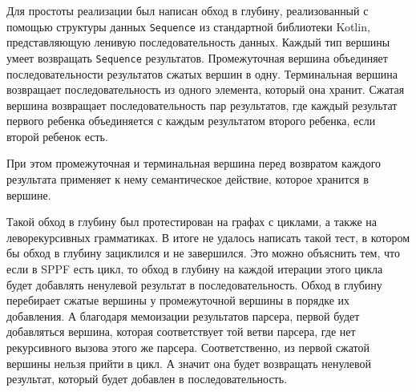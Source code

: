Для простоты реализации был написан обход в глубину, реализованный с помощью структуры данных \texttt{Sequence} из стандартной библиотеки Kotlin, представляющую ленивую последовательность данных. Каждый тип вершины умеет возвращать \texttt{Sequence} результатов. Промежуточная вершина объединяет последовательности результатов сжатых вершин в одну. Терминальная вершина возвращает последовательность из одного элемента, который она хранит. Сжатая вершина возвращает последовательность пар результатов, где каждый результат первого ребенка объединяется с каждым результатом второго ребенка, если второй ребенок есть. 

При этом промежуточная и терминальная вершина перед возвратом каждого результата применяет к нему семантическое действие, которое хранится в вершине. 

Такой обход в глубину был протестирован на графах с циклами, а также на леворекурсивных грамматиках. В итоге не удалось написать такой тест, в котором бы обход в глубину зациклился и не завершился. Это можно объяснить тем, что если в SPPF есть цикл, то обход в глубину на каждой итерации этого цикла будет добавлять ненулевой результат в последовательность. Обход в глубину перебирает сжатые вершины у промежуточной вершины в порядке их добавления. А благодаря мемоизации результатов парсера, первой будет добавляться вершина, которая соответствует той ветви парсера, где нет рекурсивного вызова этого же парсера. Соответственно, из первой сжатой вершины нельзя прийти в цикл. А значит она будет возвращать ненулевой результат, который будет добавлен в последовательность.

